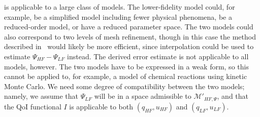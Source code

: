 \documentclass[review]{siamart0516}
\providecommand{\DIFdelbegin}{} %
\newcommand{\DIFscaledelfig}{0.5}
\newlength{\DIFdelgraphicswidth} %
\newlength{\DIFdelgraphicsheight} %
\newcommand{\DIFdelincludegraphics}[2][]{%
\sbox{\DIFdelgraphicsbox}{\DIFOincludegraphics[#1]{#2}}%
\settoboxwidth{\DIFdelgraphicswidth}{\DIFdelgraphicsbox} %
\settoboxtotalheight{\DIFdelgraphicsheight}{\DIFdelgraphicsbox} %
\scalebox{\DIFscaledelfig}{%
\parbox[b]{\DIFdelgraphicswidth}{\usebox{\DIFdelgraphicsbox}\\[-\baselineskip] \rule{\DIFdelgraphicswidth}{0em}}\llap{\resizebox{\DIFdelgraphicswidth}{\DIFdelgraphicsheight}{%
\setlength{\unitlength}{\DIFdelgraphicswidth}%
\begin{picture}(1,1)%
\thicklines\linethickness{2pt} %
{\color[rgb]{1,0,0}\put(0,0){\framebox(1,1){}}}%
{\color[rgb]{1,0,0}\put(0,0){\line( 1,1){1}}}%
{\color[rgb]{1,0,0}\put(0,1){\line(1,-1){1}}}%
\end{picture}%
}\hspace*{3pt}}} %
} %
\DeclareRobustCommand{\DIFdelbegin}{\DIFOdelbegin \let\includegraphics\DIFdelincludegraphics} %
\begin{document}
 is applicable to a large class of models. The lower-fidelity model could, for example, be a simplified model including fewer physical phenomena, be a reduced-order model, or have a reduced parameter space. The two models could also correspond to two levels of mesh refinement, though in this case the method described in~\cite{BecVex05} would likely be more efficient, since interpolation could be used to estimate $\Psi_{HF}-\Psi_{LF}$ instead. The derived error estimate is not applicable to all models, however. The two models have to be expressed in a weak form, so this cannot be applied to, for example, a model of chemical reactions using kinetic Monte Carlo. We need some degree of compatibility between the two models; namely, we assume that $\Psi_{LF}$ will be in a space admissible to $\mathcal{M}'_{HF,\Psi}$, and that the QoI functional $I$ is applicable to both $(q_{HF},u_{HF})$ and $(q_{LF},u_{LF})$.

\DIFdelbegin %

\end{document}
